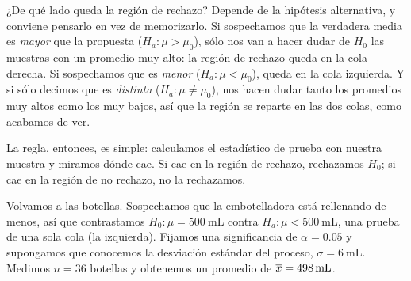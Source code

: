 
¿De qué lado queda la región de rechazo? Depende de la hipótesis alternativa, y conviene pensarlo en vez de memorizarlo. Si sospechamos que la verdadera media es \emph{mayor} que la propuesta (\(H_a: \mu>\mu_0\)), sólo nos van a hacer dudar de \(H_0\) las muestras con un promedio muy alto: la región de rechazo queda en la cola derecha. Si sospechamos que es \emph{menor} (\(H_a:\mu<\mu_0\)), queda en la cola izquierda. Y si sólo decimos que es \emph{distinta} (\(H_a:\mu\neq\mu_0\)), nos hacen dudar tanto los promedios muy altos como los muy bajos, así que la región se reparte en las dos colas, como acabamos de ver.

La regla, entonces, es simple: calculamos el estadístico de prueba con nuestra muestra y miramos dónde cae. Si cae en la región de rechazo, rechazamos \(H_0\); si cae en la región de no rechazo, no la rechazamos.

Volvamos a las botellas. Sospechamos que la embotelladora está rellenando de menos, así que contrastamos \(H_0: \mu=\qty{500}{\milli\liter}\) contra \(H_a: \mu<\qty{500}{\milli\liter}\), una prueba de una sola cola (la izquierda). Fijamos una significancia de \(\alpha=\num{0,05}\) y supongamos que conocemos la desviación estándar del proceso, \(\sigma=\qty{6}{\milli\liter}\). Medimos \(n=36\) botellas y obtenemos un promedio de \(\overline{x}=\qty{498}{\milli\liter}\).

